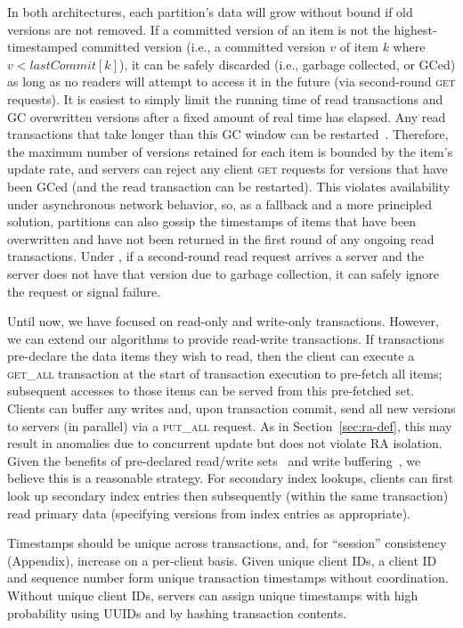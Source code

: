 In both architectures, each partition's data will grow without bound
if old versions are not removed. If a committed version of an item is
not the highest-timestamped committed version (i.e., a committed
version $v$ of item $k$ where $v < lastCommit[k]$), it can be safely
discarded (i.e., garbage collected, or GCed) as long as no readers
will attempt to access it in the future (via second-round \textsc{get}
requests). It is easiest to simply limit the running time of read
transactions and GC overwritten versions after a fixed amount of real
time has elapsed. Any read transactions that take longer than this GC
window can be restarted~\cite{cops,eiger}. Therefore, the maximum
number of versions retained for each item is bounded by the item's
update rate, and servers can reject any client \textsc{get} requests
for versions that have been GCed (and the read transaction can be
restarted). This violates availability under asynchronous network
behavior, so, as a fallback and a more principled solution, partitions
can also gossip the timestamps of items that have been overwritten and
have not been returned in the first round of any ongoing read
transactions. Under \rapl, if a second-round read request arrives a
server and the server does not have that version due to garbage
collection, it can safely ignore the request or signal failure.

 Until now, we have focused on
read-only and write-only transactions. However, we can extend our
algorithms to provide read-write transactions. If transactions
pre-declare the data items they wish to read, then the client can
execute a \textsc{get\_all} transaction at the start of transaction
execution to pre-fetch all items; subsequent accesses to those items
can be served from this pre-fetched set. Clients can buffer any writes
and, upon transaction commit, send all new versions to servers (in
parallel) via a \textsc{put\_all} request. As in
Section~\ref{sec:ra-def}, this may result in anomalies due to
concurrent update but does not violate RA isolation. Given the
benefits of pre-declared read/write
sets~\cite{schism,pavlo-partition,calvin} and write
buffering~\cite{spanner,f1}, we believe this is a reasonable
strategy. For secondary index lookups, clients can first look up
secondary index entries then subsequently (within the same
transaction) read primary data (specifying versions from index entries as
appropriate).

 Timestamps should be unique across transactions,
and, for ``session'' consistency (Appendix), increase on a per-client
basis. Given unique client IDs, a client ID and sequence number form
unique transaction timestamps without coordination. Without unique
client IDs, servers can assign unique timestamps with high probability
using UUIDs and by hashing transaction contents.

